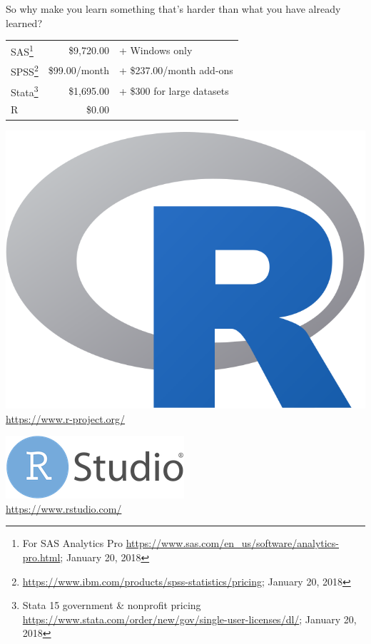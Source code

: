 \documentclass[]{beamer}
\begin{document}
\begin{frame}
So why make you learn something that's harder than what you have already learned?
\begin{center}
\begin{tabular}{lrl} \toprule
SAS\footnote{\tiny For SAS Analytics Pro \url{https://www.sas.com/en_us/software/analytics-pro.html}; January 20, 2018} & \$9,720.00 & + Windows only \\
SPSS\footnote{\tiny \url{https://www.ibm.com/products/spss-statistics/pricing}; January 20, 2018} & \$99.00\slash month & + \$237.00/month add-ons \\
Stata\footnote{\tiny Stata 15 government \& nonprofit pricing \url{https://www.stata.com/order/new/gov/single-user-licenses/dl/}; January 20, 2018} & \$1,695.00 & + \$300 for large datasets \\
R & \$0.00 & \\ \bottomrule
\end{tabular}
\end{center}

\end{frame}

\begin{frame}
\includegraphics[width=.5\linewidth]{images/RLogo.png}\\[3em]

{\LARGE \url{https://www.r-project.org/}}
\end{frame}


\begin{frame}
\includegraphics[width=.5\linewidth]{images/RStudioLogo.png}\\[3em]

{\LARGE \url{https://www.rstudio.com/}}
\end{frame}
\end{document}
